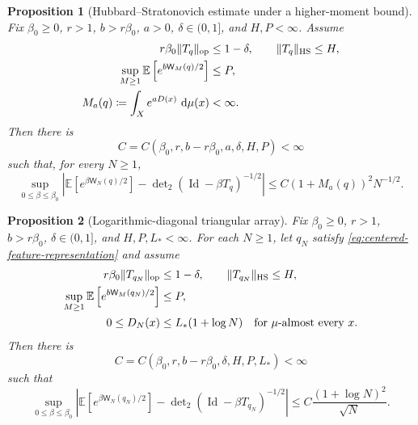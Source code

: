 \documentclass[11pt,reqno]{amsart}
\numberwithin{equation}{section}
\theoremstyle{plain}
\newtheorem{prop}[prop]{Proposition}
\theoremstyle{definition}
\DeclarePairedDelimiter{\norm}{\lVert}{\rVert}
\newcommand{\dd}{\mathop{}\!\mathrm d}
\newcommand{\E}{\mathbb E}
\newcommand{\Id}{\operatorname{Id}}
\newcommand{\HS}{\mathrm{HS}}
\newcommand{\op}{\mathrm{op}}
\newcommand{\be}{\beta}
\begin{document}
\begin{prop}[Hubbard--Stratonovich estimate under a higher-moment bound]
\label{prop:renyi-feature-space}
Fix $\be_0\geq0$, $r>1$, $b>r\be_0$, $a>0$, $\delta\in(0,1]$, and $H,P<\infty$.  Assume
\begin{align}
 r\be_0\norm{T_q}_{\op}&\leq1-\delta,
 \qquad
 \norm{T_q}_{\HS}\leq H,
 \label{eq:renyi-feature-operator-assumptions}\\
 \sup_{M\geq1}\E\left[e^{b\mathsf W_M(q)/2}\right]&\leq P,
 \label{eq:renyi-feature-particle-assumption}\\
 M_a(q)\coloneqq\int_Xe^{aD(x)}\,\dd\mu(x)&<\infty.
 \label{eq:renyi-feature-diagonal-assumption}
\end{align}
Then there is
\begin{equation}
 C=C(\be_0,r,b-r\be_0,a,\delta,H,P)<\infty
 \label{eq:renyi-feature-constant}
\end{equation}
such that, for every $N\geq1$,
\begin{equation}
 \sup_{0\leq\be\leq\be_0}
 \left|\E\left[e^{\be\mathsf W_N(q)/2}\right]
 -\det\nolimits_2(\Id-\be T_q)^{-1/2}\right|
 \leq C(1+M_a(q))^2N^{-1/2}.
 \label{eq:renyi-feature-rate}
\end{equation}
\end{prop}

\begin{prop}[Logarithmic-diagonal triangular array]
\label{prop:triangular-feature-space}
Fix $\be_0\geq0$, $r>1$, $b>r\be_0$, $\delta\in(0,1]$, and $H,P,L_*<\infty$.  For each $N\geq1$, let $q_N$ satisfy \eqref{eq:centered-feature-representation} and assume
\begin{align}
 r\be_0\norm{T_{q_N}}_{\op}&\leq1-\delta,
 \qquad
 \norm{T_{q_N}}_{\HS}\leq H,
 \label{eq:triangular-feature-operator-assumptions}\\
 \sup_{M\geq1}\E\left[e^{b\mathsf W_M(q_N)/2}\right]&\leq P,
 \label{eq:triangular-feature-particle-assumption}\\
 0\leq D_N(x)&\leq L_*(1+\log N)
 \quad\text{for }\mu\text{-almost every }x.
 \label{eq:triangular-feature-diagonal-assumption}
\end{align}
Then there is
\begin{equation}
 C=C(\be_0,r,b-r\be_0,\delta,H,P,L_*)<\infty
 \label{eq:triangular-feature-constant}
\end{equation}
such that
\begin{equation}
 \sup_{0\leq\be\leq\be_0}
 \left|\E\left[e^{\be\mathsf W_N(q_N)/2}\right]
 -\det\nolimits_2(\Id-\be T_{q_N})^{-1/2}\right|
 \leq C\frac{(1+\log N)^2}{\sqrt N}.
 \label{eq:triangular-feature-rate}
\end{equation}
\end{prop}
\end{document}
